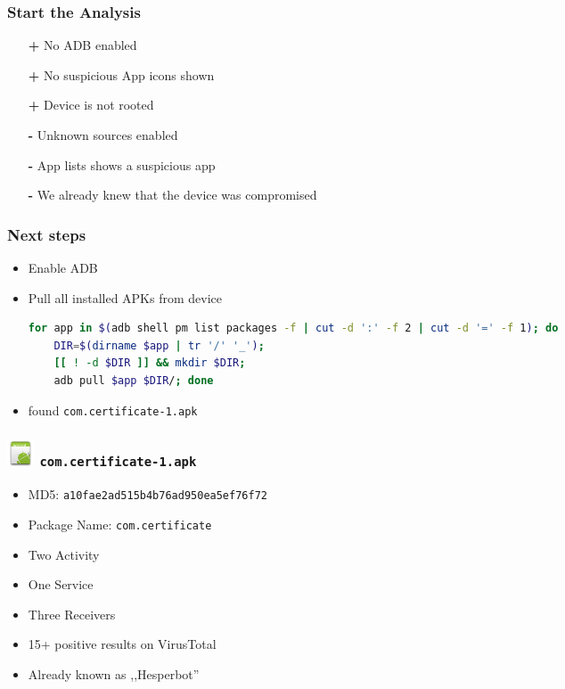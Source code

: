 \documentclass[12pt,a4paper]{beamer}
\begin{document}
\begin{frame}
\frametitle{Start the Analysis}
\begin{itemize}
	\item[\textbf{\color{green}+}] No ADB enabled
	\item[\textbf{\color{green}+}] No suspicious App icons shown
	\item[\textbf{\color{green}+}] Device is not rooted
	\item[\textbf{\color{red}-}] Unknown sources enabled 
	\item[\textbf{\color{red}-}] App lists shows a suspicious app
	\item[\textbf{\color{red}-}] We already knew that the device was compromised
\end{itemize}
\end{frame}

\begin{frame}[fragile]
	\frametitle{Next steps}
	
	\begin{itemize}
		\item Enable ADB
		\item Pull all installed APKs from device
	
	\begin{lstlisting}[language=bash]
	for app in $(adb shell pm list packages -f | cut -d ':' -f 2 | cut -d '=' -f 1); do 
	DIR=$(dirname $app | tr '/' '_'); 
	[[ ! -d $DIR ]] && mkdir $DIR; 
	adb pull $app $DIR/; done
	\end{lstlisting}

	\item found \texttt{com.certificate-1.apk}
	\end{itemize}	
\end{frame}

\newcommand{\certificateIcon}{\includegraphics[keepaspectratio=true,height=0.8cm]{images/icon.png} \texttt{com.certificate-1.apk}}

\begin{frame}
\frametitle{\certificateIcon}
	
	\begin{itemize}
		\item MD5: \texttt{a10fae2ad515b4b76ad950ea5ef76f72}
		\item Package Name: \texttt{com.certificate}
		\item Two Activity
		\item One Service
		\item Three Receivers
		\item 15+ positive results on VirusTotal
		\item Already known as ,,Hesperbot''
	\end{itemize}

\end{frame}
\end{document}
